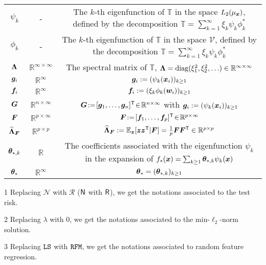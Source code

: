 \begin{table}[H]
\begin{threeparttable}
\begin{tabular}{c | c | c}
$\psi_k$ & - & The $k$-th eigenfunction of $\mathbb{T}$ in the space $L_2(\mu_{\boldsymbol x})$, defined by the decomposition
$\mathbb{T} = \sum_{k=1}^\infty \xi_k \psi_k \phi_k^*$ \\
$\phi_k$ & - & The $k$-th eigenfunction of $\mathbb{T}$ in the space $\mathcal{V}$, defined by the decomposition
$\mathbb{T} = \sum_{k=1}^\infty \xi_k \psi_k \phi_k^*$ \\
${\boldsymbol \Lambda}$ & $\mathbb{R}^{\infty \times \infty}$ & The spectral matrix of $\mathbb{T}$, ${\boldsymbol \Lambda} = \operatorname{diag}(\xi_1^2, \xi_2^2, \ldots) \in \mathbb{R}^{\infty \times \infty}$ \\
${\boldsymbol g}_i$ & $\mathbb{R}^{\infty}$ & ${\boldsymbol g}_i := (\psi_k({\boldsymbol x}_i))_{k \geq 1}$\\
$\boldsymbol{f}_i$ & $\mathbb{R}^{\infty}$ & $\boldsymbol{f}_i := (\xi_k\phi_k({\boldsymbol w}_i))_{k \geq 1}$\\
${\boldsymbol G}$ & $\mathbb{R}^{n \times \infty}$ & 
${\boldsymbol G} \!:=\! [{\boldsymbol g}_1, \ldots, {\boldsymbol g}_n]^{\mathsf T} \!\in\! \mathbb{R}^{n \times \infty}$ with ${\boldsymbol g}_i := (\psi_k({\boldsymbol x}_i))_{k \geq 1}$\\
${\boldsymbol F}$ & $\mathbb{R}^{p \times \infty}$ & ${\boldsymbol F} \!:=\! [\boldsymbol{f}_1, \ldots, \boldsymbol{f}_p]^{\mathsf T} \!\in\! \mathbb{R}^{p \times \infty}$\\
$\widehat{{\boldsymbol \Lambda}}_{\boldsymbol F}$ & $\mathbb{R}^{p \times p}$ & $\widehat{{\boldsymbol \Lambda}}_{\boldsymbol F} := \mathbb{E}_{\boldsymbol z}[{\boldsymbol z}{\boldsymbol z}^{\mathsf T}|{\boldsymbol F}] = \frac{1}{p}{\boldsymbol F}{\boldsymbol F}^{\mathsf T} \in \mathbb{R}^{p \times p}$ \\
${\boldsymbol \theta}_{*,k}$ & $\mathbb{R}$ & The coefficients associated with the eigenfunction $\psi_k$ in the expansion of $f_*({\boldsymbol x})=\sum_{k\geq1}{\boldsymbol \theta}_{*,k}\psi_k({\boldsymbol x})$ \\
${\boldsymbol \theta}_*$ & $\mathbb{R}^{\infty}$ & ${\boldsymbol \theta}_* = ({\boldsymbol \theta}_{*,k})_{k \geq 1}$ \\
\midrule
\end{tabular}
\begin{tablenotes}
    \footnotesize
    \item[1] Replacing $\mathcal{N}$ with $\mathcal{R}$ ($\mathsf N$ with $\mathsf R$), we get the notations associated to the test risk.
    \item[2] Replacing $\lambda$ with $0$, we get the notations associated to the min-$\ell_2$-norm solution.
    \item[3] Replacing ${\tt LS}$ with ${\tt RFM}$, we get the notations associated to random feature regression.
\end{tablenotes}
\end{threeparttable}
\end{table}